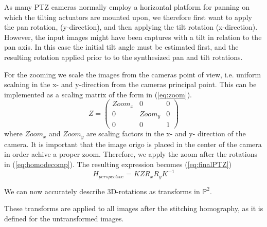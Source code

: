 As many PTZ cameras normally employ a horizontal platform for panning on which the tilting actuators are mounted upon, we therefore first want to apply the pan rotation, (y-direction), and then applying the tilt rotation (x-direction).
However, the input images might have been captures with a tilt in relation to the pan axis.
In this case the initial tilt angle must be estimated first, and the resulting rotation applied prior to to the synthesized pan and tilt rotations.

	For the zooming we scale the images from the cameras point of view, i.e. uniform scalning in the x- and y-direction from the cameras principal point. 
	This can be implemented as a scaling matrix of the form in (\ref{eq:zoom}).
	\begin{equation}
		Z=\begin{pmatrix} 
			Zoom_x & 0 & 0 \\
			0 & Zoom_y & 0 \\
			0 & 0 & 1
		\end{pmatrix}
		\label{eq:zoom}
	\end{equation}
	where $Zoom_x$ and $Zoom_y$ are scaling factors in the x- and y- direction of the camera.
	It is important that the image origo is placed in the center of the camera in order achive a proper zoom.
	Therefore, we apply the zoom after the rotations in (\ref{eq:homodecomp}). The resulting expression becomes (\ref{eq:finalPTZ})
	\begin{equation}
		H_{perspective}=K Z  R_{x}R_{y}  K^{-1}
		\label{eq:finalPTZ}
	\end{equation}

	We can now accurately describe 3D-rotations as transforms in $\mathbb{P}^2$.

These transforms are applied to all images after the stitching homography, as it is defined for the untransformed images.
